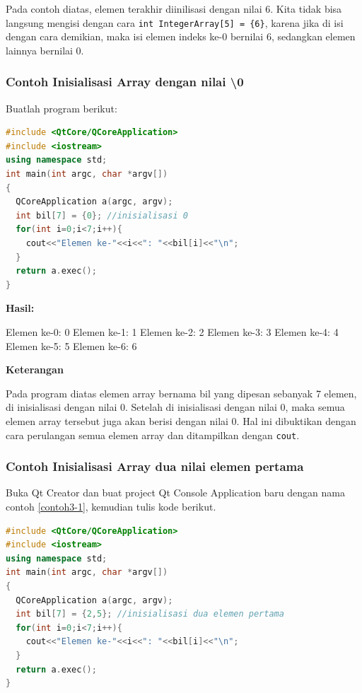 Pada contoh diatas, elemen terakhir diinilisasi dengan nilai 6. Kita
tidak bisa langsung mengisi dengan cara
\texttt{int\ IntegerArray{[}5{]}\ =\ \{6\}}, karena jika di isi dengan
cara demikian, maka isi elemen indeks ke-0 bernilai 6, sedangkan elemen
lainnya bernilai 0.

\subsubsection*{Contoh  Inisialisasi Array dengan nilai \textbackslash{}0}

Buatlah program berikut:

\begin{lstlisting}[language=c++, caption=Inisialisasi Array dengan nilai \textbackslash{}0, label=contoh3-4]
#include <QtCore/QCoreApplication>
#include <iostream>
using namespace std;
int main(int argc, char *argv[])
{
  QCoreApplication a(argc, argv);
  int bil[7] = {0}; //inisialisasi 0
  for(int i=0;i<7;i++){
    cout<<"Elemen ke-"<<i<<": "<<bil[i]<<"\n";
  }
  return a.exec();
}
\end{lstlisting}

\textbf{Hasil:}

\begin{lcverbatim}
Elemen ke-0: 0
Elemen ke-1: 1
Elemen ke-2: 2
Elemen ke-3: 3
Elemen ke-4: 4
Elemen ke-5: 5
Elemen ke-6: 6
\end{lcverbatim}

\textbf{Keterangan}

Pada program diatas elemen array bernama bil yang dipesan sebanyak 7
elemen, di inisialisasi dengan nilai 0. Setelah di inisialisasi dengan
nilai 0, maka semua elemen array tersebut juga akan berisi dengan nilai
0. Hal ini dibuktikan dengan cara perulangan semua elemen array dan
ditampilkan dengan \texttt{cout}.

\subsubsection*{Contoh  Inisialisasi Array dua nilai elemen pertama}

Buka Qt Creator dan buat project Qt Console Application baru dengan
nama contoh \ref{contoh3-1}, kemudian tulis kode berikut.

\begin{lstlisting}[language=c++, caption=Inisialisasi Array dua nilai elemen pertama, label=contoh3-5]
#include <QtCore/QCoreApplication>
#include <iostream>
using namespace std;
int main(int argc, char *argv[])
{
  QCoreApplication a(argc, argv);
  int bil[7] = {2,5}; //inisialisasi dua elemen pertama
  for(int i=0;i<7;i++){
    cout<<"Elemen ke-"<<i<<": "<<bil[i]<<"\n";
  }
  return a.exec();
}
\end{lstlisting}

